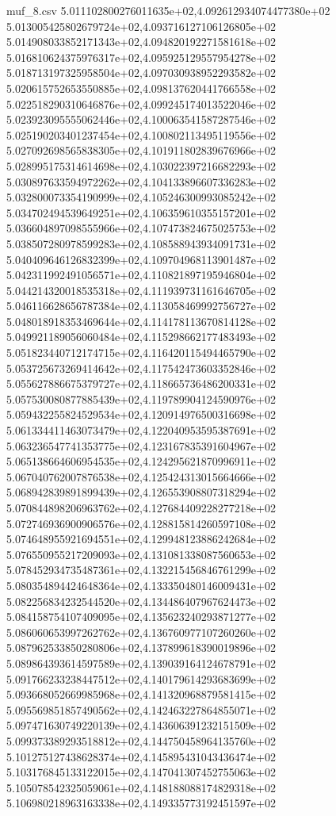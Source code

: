 \begin{filecontents*}{muf_8.csv}
5.011102800276011635e+02,4.092612934074477380e+02
5.013005425802679724e+02,4.093716127106126805e+02
5.014908033852171343e+02,4.094820192271581618e+02
5.016810624375976317e+02,4.095925129557954278e+02
5.018713197325958504e+02,4.097030938952293582e+02
5.020615752653550885e+02,4.098137620441766558e+02
5.022518290310646876e+02,4.099245174013522046e+02
5.023923095555062446e+02,4.100063541587287546e+02
5.025190203401237454e+02,4.100802113495119556e+02
5.027092698565838305e+02,4.101911802839676966e+02
5.028995175314614698e+02,4.103022397216682293e+02
5.030897633594972262e+02,4.104133896607336283e+02
5.032800073354190999e+02,4.105246300993085242e+02
5.034702494539649251e+02,4.106359610355157201e+02
5.036604897098555966e+02,4.107473824675025753e+02
5.038507280978599283e+02,4.108588943934091731e+02
5.040409646126832399e+02,4.109704968113901487e+02
5.042311992491056571e+02,4.110821897195946804e+02
5.044214320018535318e+02,4.111939731161646705e+02
5.046116628656787384e+02,4.113058469992756727e+02
5.048018918353469644e+02,4.114178113670814128e+02
5.049921189056060484e+02,4.115298662177483493e+02
5.051823440712174715e+02,4.116420115494465790e+02
5.053725673269414642e+02,4.117542473603352846e+02
5.055627886675379727e+02,4.118665736486200331e+02
5.057530080877885439e+02,4.119789904124590976e+02
5.059432255824529534e+02,4.120914976500316698e+02
5.061334411463073479e+02,4.122040953595387691e+02
5.063236547741353775e+02,4.123167835391604967e+02
5.065138664606954535e+02,4.124295621870996911e+02
5.067040762007876538e+02,4.125424313015664666e+02
5.068942839891899439e+02,4.126553908807318294e+02
5.070844898206963762e+02,4.127684409228277218e+02
5.072746936900906576e+02,4.128815814260597108e+02
5.074648955921694551e+02,4.129948123886242684e+02
5.076550955217209093e+02,4.131081338087560653e+02
5.078452934735487361e+02,4.132215456846761299e+02
5.080354894424648364e+02,4.133350480146009431e+02
5.082256834232544520e+02,4.134486407967624473e+02
5.084158754107409095e+02,4.135623240293871277e+02
5.086060653997262762e+02,4.136760977107260260e+02
5.087962533850280806e+02,4.137899618390019896e+02
5.089864393614597589e+02,4.139039164124678791e+02
5.091766233238447512e+02,4.140179614293683699e+02
5.093668052669985968e+02,4.141320968879581415e+02
5.095569851857490562e+02,4.142463227864855071e+02
5.097471630749220139e+02,4.143606391232151509e+02
5.099373389293518812e+02,4.144750458964135760e+02
5.101275127438628374e+02,4.145895431043436474e+02
5.103176845133122015e+02,4.147041307452755063e+02
5.105078542325059061e+02,4.148188088174829318e+02
5.106980218963163338e+02,4.149335773192451597e+02

\end{filecontents*}
